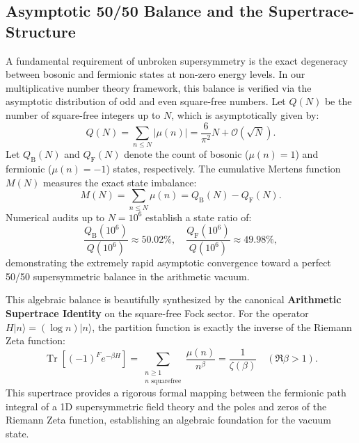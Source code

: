 \documentclass[11pt,a4paper]{article}
\theoremstyle{definition}
\begin{document}
	\subsection{Asymptotic 50/50 Balance and the Supertrace-Structure}
	A fundamental requirement of unbroken supersymmetry is the exact degeneracy between bosonic and fermionic states at non-zero energy levels. In our multiplicative number theory framework, this balance is verified via the asymptotic distribution of odd and even square-free numbers. Let $Q(N)$ be the number of square-free integers up to $N$, which is asymptotically given by:
	\begin{equation}
		Q(N) = \sum_{n \le N} |\mu(n)| = \frac{6}{\pi^2} N + \mathcal{O}(\sqrt{N}).
	\end{equation}
	Let $Q_{\text{B}}(N)$ and $Q_{\text{F}}(N)$ denote the count of bosonic ($\mu(n) = 1$) and fermionic ($\mu(n) = -1$) states, respectively. The cumulative Mertens function $M(N)$ measures the exact state imbalance:
	\begin{equation}
		M(N) = \sum_{n \le N} \mu(n) = Q_{\text{B}}(N) - Q_{\text{F}}(N).
	\end{equation}
	Numerical audits up to $N = 10^6$ establish a state ratio of:
	\begin{equation}
		\frac{Q_{\text{B}}(10^6)}{Q(10^6)} \approx 50.02\%, \quad \frac{Q_{\text{F}}(10^6)}{Q(10^6)} \approx 49.98\%,
	\end{equation}
	demonstrating the extremely rapid asymptotic convergence toward a perfect 50/50 supersymmetric balance in the arithmetic vacuum.
	
	This algebraic balance is beautifully synthesized by the canonical \textbf{Arithmetic Supertrace Identity} on the square-free Fock sector. For the operator $H|n\rangle = (\log n)|n\rangle$, the partition function is exactly the inverse of the Riemann Zeta function:
	\begin{equation}
		\label{eq:supertrace_identity}
		\operatorname{Tr}\left[(-1)^F e^{-\beta H}\right] = \sum_{\substack{n \ge 1 \\ n \text{ squarefree}}} \frac{\mu(n)}{n^\beta} = \frac{1}{\zeta(\beta)} \quad (\Re \beta > 1).
	\end{equation}
	This supertrace provides a rigorous formal mapping between the fermionic path integral of a 1D supersymmetric field theory and the poles and zeros of the Riemann Zeta function, establishing an algebraic foundation for the vacuum state.
	
\end{document}

